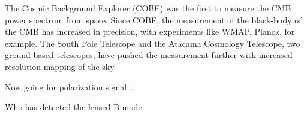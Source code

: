 The Cosmic Background Explorer (COBE) was the first to measure the CMB power spectrum from space.  Since COBE, the measurement of the black-body of the CMB has increased in precision, with experiments like WMAP, Planck, for example.  The South Pole Telescope and the Atacama Cosmology Telescope, two ground-based telescopes, have pushed the measurement further with increased resolution mapping of the sky.

Now going for polarization signal...

Who has detected the lensed B-mode. 





